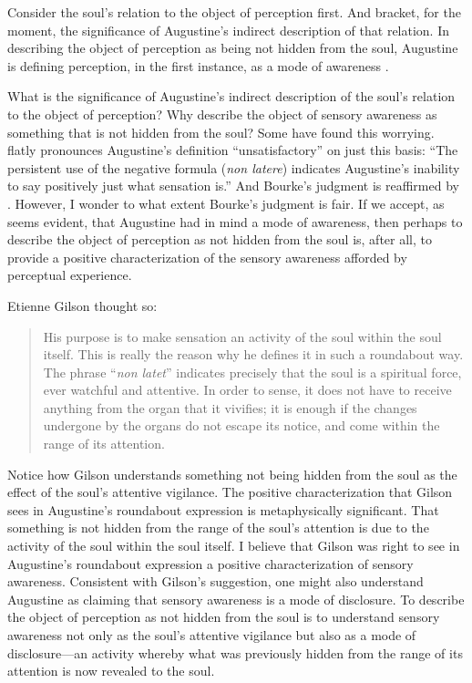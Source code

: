 \documentclass[12pt]{article}
\begin{document}
Consider the soul's relation to the object of perception first. And bracket, for the moment, the significance of Augustine's indirect description of that relation. In describing the object of perception as being not hidden from the soul, Augustine is defining perception, in the first instance, as a mode of awareness \citep[275]{Brittain:2002hl}. 

What is the significance of Augustine's indirect description of the soul's relation to the object of perception? Why describe the object of sensory awareness as something that is not hidden from the soul? Some have found this worrying. \citet[112]{Bourke:1947jk} flatly pronounces Augustine's definition ``unsatisfactory'' on just this basis: ``The persistent use of the negative formula (\emph{non latere}) indicates Augustine's inability to say positively just what sensation is.'' And Bourke's judgment is reaffirmed by \citet[104, n.1]{McMahon:1947dn}. However, I wonder to what extent Bourke's judgment is fair. If we accept, as seems evident, that Augustine had in mind a mode of awareness, then perhaps to describe the object of perception as not hidden from the soul is, after all, to provide a positive characterization of the sensory awareness afforded by perceptual experience.

Etienne Gilson thought so:
\begin{quote}
	His purpose is to make sensation an activity of the soul within the soul itself. This is really the reason why he defines it in such a roundabout way. The phrase ``\emph{non latet}'' indicates precisely that the soul is a spiritual force, ever watchful and attentive. In order to sense, it does not have to receive anything from the organ that it vivifies; it is enough if the changes undergone by the organs do not escape its notice, and come within the range of its attention. \citep[63]{Gilson:1961ec}
\end{quote}
Notice how Gilson understands something not being hidden from the soul as the effect of the soul's attentive vigilance. The positive characterization that Gilson sees in Augustine's roundabout expression is metaphysically significant. That something is not hidden from the range of the soul's attention is due to the activity of the soul within the soul itself. I believe that Gilson was right to see in Augustine's roundabout expression a positive characterization of sensory awareness. Consistent with Gilson's suggestion, one might also understand Augustine as claiming that sensory awareness is a mode of disclosure. To describe the object of perception as not hidden from the soul is to understand sensory awareness not only as the soul's attentive vigilance but also as a mode of disclosure---an activity whereby what was previously hidden from the range of its attention is now revealed to the soul.
\end{document}
